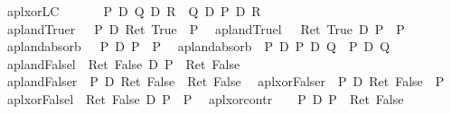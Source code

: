 \begin{isabellebody}
\ \ apl{\isacharunderscore}xor{\isacharunderscore}LC{\isacharcolon}\ \ \ \ \ \ \ {\isachardoublequote}{\isacharparenleft}P\ {\isasymoplus}\isactrlsub D\ {\isacharparenleft}Q\ {\isasymoplus}\isactrlsub D\ R{\isacharparenright}{\isacharparenright}\ {\isacharequal}\ {\isacharparenleft}Q\ {\isasymoplus}\isactrlsub D\ {\isacharparenleft}P\ {\isasymoplus}\isactrlsub D\ R{\isacharparenright}{\isacharparenright}{\isachardoublequote}\isanewline
\ \ apl{\isacharunderscore}and{\isacharunderscore}True{\isacharunderscore}r{\isacharcolon}\ \ \ {\isachardoublequote}{\isacharparenleft}P\ {\isasymand}\isactrlsub D\ Ret\ True{\isacharparenright}\ {\isacharequal}\ P{\isachardoublequote}\isanewline
\ \ apl{\isacharunderscore}and{\isacharunderscore}True{\isacharunderscore}l{\isacharcolon}\ \ \ {\isachardoublequote}{\isacharparenleft}Ret\ True\ {\isasymand}\isactrlsub D\ P{\isacharparenright}\ {\isacharequal}\ P{\isachardoublequote}\isanewline
\ \ apl{\isacharunderscore}and{\isacharunderscore}absorb{\isacharcolon}\ \ \ {\isachardoublequote}{\isacharparenleft}P\ {\isasymand}\isactrlsub D\ P{\isacharparenright}\ {\isacharequal}\ P{\isachardoublequote}\isanewline
\ \ apl{\isacharunderscore}and{\isacharunderscore}absorb{}{\isacharcolon}\ \ {\isachardoublequote}{\isacharparenleft}P\ {\isasymand}\isactrlsub D\ {\isacharparenleft}P\ {\isasymand}\isactrlsub D\ Q{\isacharparenright}{\isacharparenright}\ {\isacharequal}\ {\isacharparenleft}P\ {\isasymand}\isactrlsub D\ Q{\isacharparenright}{\isachardoublequote}\isanewline
\ \ apl{\isacharunderscore}and{\isacharunderscore}False{\isacharunderscore}l{\isacharcolon}\ \ {\isachardoublequote}{\isacharparenleft}Ret\ False\ {\isasymand}\isactrlsub D\ P{\isacharparenright}\ {\isacharequal}\ Ret\ False{\isachardoublequote}\isanewline
\ \ apl{\isacharunderscore}and{\isacharunderscore}False{\isacharunderscore}r{\isacharcolon}\ \ {\isachardoublequote}{\isacharparenleft}P\ {\isasymand}\isactrlsub D\ Ret\ False{\isacharparenright}\ {\isacharequal}\ Ret\ False{\isachardoublequote}\isanewline
\ \ apl{\isacharunderscore}xor{\isacharunderscore}False{\isacharunderscore}r{\isacharcolon}\ \ {\isachardoublequote}{\isacharparenleft}P\ {\isasymoplus}\isactrlsub D\ Ret\ False{\isacharparenright}\ {\isacharequal}\ P{\isachardoublequote}\isanewline
\ \ apl{\isacharunderscore}xor{\isacharunderscore}False{\isacharunderscore}l{\isacharcolon}\ \ {\isachardoublequote}{\isacharparenleft}Ret\ False\ {\isasymoplus}\isactrlsub D\ P{\isacharparenright}\ {\isacharequal}\ P{\isachardoublequote}\isanewline
\ \ apl{\isacharunderscore}xor{\isacharunderscore}contr{\isacharcolon}\ \ \ \ {\isachardoublequote}{\isacharparenleft}P\ {\isasymoplus}\isactrlsub D\ P{\isacharparenright}\ {\isacharequal}\ Ret\ False{\isachardoublequote}\isanewline

\end{isabellebody}
